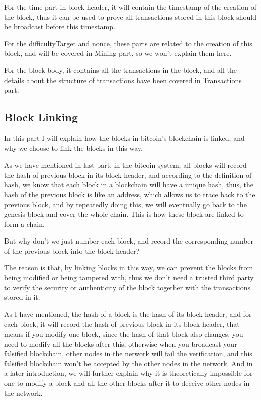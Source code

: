\documentclass[12pt,a4paper]{article}
\begin{document}
For the time part in block header, it will contain the timestamp of the creation of the block, thus it can be used to prove all transactions stored in this block should be broadcast before this timestamp.

For the difficultyTarget and nonce, these parts are related to the creation of this block, and will be covered in Mining part, so we won't explain them here.

For the block body, it contains all the transactions in the block, and all the details about the structure of transactions have been covered in Transactions part.

\subsection{Block Linking}

In this part I will explain how the blocks in bitcoin's blockchain is linked, and why we choose to link the blocks in this way.

As we have mentioned in last part, in the bitcoin system, all blocks will record the hash of previous block in its block header, and according to the definition of hash, we know that each block in a blockchain will have a unique hash, thus, the hash of the previous block is like an address, which allows us to trace back to the previous block, and by repeatedly doing this, we will eventually go back to the genesis block and cover the whole chain. This is how these block are linked to form a chain.

But why don't we just number each block, and record the corresponding number of the previous block into the block header?

The reason is that, by linking blocks in this way, we can prevent the blocks from being modified or being tampered with, thus we don't need a trusted third party to verify the security or authenticity of the block together with the transactions stored in it.

As I have mentioned, the hash of a block is the hash of its block header, and for each block, it will record the hash of previous block in its block header, that means if you modify one block, since the hash of that block also changes, you need to modify all the blocks after this, otherwise when you broadcast your falsified blockchain, other nodes in the network will fail the verification, and this falsified blockchain won't be accepted by the other nodes in the network. And in a later introduction, we will further explain why it is theoretically impossible for one to modify a block and all the other blocks after it to deceive other nodes in the network.
\end{document}
